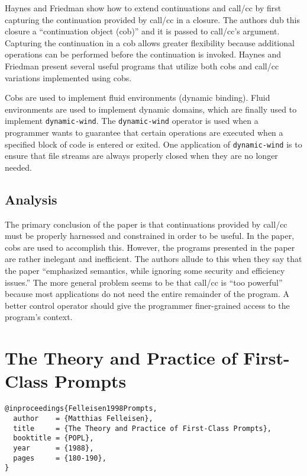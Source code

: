 \documentclass[letterpaper]{llncs}
\begin{document}
Haynes and Friedman show how to extend continuations and call/cc by first capturing the continuation provided by call/cc in a closure. The authors dub this closure a ``continuation object (cob)'' and it is passed to call/cc's argument. Capturing the continuation in a cob allows greater flexibility because additional operations can be performed before the continuation is invoked. Haynes and Friedman present several useful programs that utilize both cobs and call/cc variations implemented using cobs.

Cobs are used to implement fluid environments (dynamic binding). Fluid environments are used to implement dynamic domains, which are finally used to implement \texttt{dynamic-wind}. The \texttt{dynamic-wind} operator is used when a programmer wants to guarantee that certain operations are executed when a specified block of code is entered or exited. One application of \texttt{dynamic-wind} is to ensure that file streams are always properly closed when they are no longer needed.

\subsection*{Analysis}

The primary conclusion of the paper is that continuations provided by call/cc must be properly harnessed and constrained in order to be useful. In the paper, cobs are used to accomplish this. However, the programs presented in the paper are rather inelegant and inefficient. The authors allude to this when they say that the paper ``emphasized semantics, while ignoring some security and efficiency issues.'' The more general problem seems to be that call/cc is ``too powerful'' because most applications do not need the entire remainder of the program. A better control operator should give the programmer finer-grained access to the program's context.


\section*{The Theory and Practice of First-Class Prompts}%

\begin{verbatim}
@inproceedings{Felleisen1998Prompts,
  author    = {Matthias Felleisen},
  title     = {The Theory and Practice of First-Class Prompts},
  booktitle = {POPL},
  year      = {1988},
  pages     = {180-190},
}
\end{verbatim}
\end{document}
